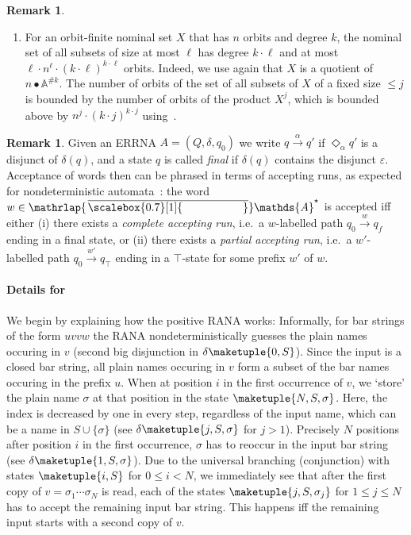 \documentclass[10pt,a4paper]{amsart}
\theoremstyle{definition}
\newtheorem{rem}[theo]{Remark}
\newcommand{\xra}[1]{\xrightarrow{#1}}
\newcommand{\xto}[1]{\xra{#1}}
\newcommand{\At}{\mathds{A}}
\newcommand{\barAs}{\barNames^{\star}}
\renewcommand{\epsilon}{\varepsilon}
\newcommand{\names}{\At}
\newcommand{\set}[1]{\{#1\}}
\newcommand{\mybar}[3]{%
  \mathrlap{\hspace{#2}\overline{\scalebox{#1}[1]{\phantom{\ensuremath{#3}}}}}\ensuremath{#3}
}
\newcommand{\barNames}{{\mybar{0.7}{1.25pt}{\names}}}
\renewcommand{\enquote}[1]{`#1'}
\begin{document}
\begin{rem}
\begin{enumerate}
  \item\label{R:Bell:5} For an orbit-finite nominal set $X$ that has $n$ orbits and degree $k$, the nominal set of all subsets of size at most $\ell$ has degree $k \cdot \ell$ and at most $\ell \cdot n^\ell \cdot (k\cdot \ell)^{k \cdot\ell}$ orbits.
    Indeed, we use again that $X$ is a quotient of $n \bullet
    \names^{\# k}$. The number of orbits of the set of all subsets of $X$ of a fixed size $\leqslant j$ is bounded by the number of orbits of the product $X^j$, which is bounded above by 
    $n^j \cdot (k\cdot j)^{k \cdot j}$ using~.
  \end{enumerate}
\end{rem}

\begin{rem}\label{rem:ernna}
Given an ERRNA $A=(Q,\delta,q_0)$ we write $q\xto{\alpha} q'$ if $\Diamond_\alpha q'$ is a disjunct of $\delta(q)$, and a state $q$ is called \emph{final} if $\delta(q)$ contains the disjunct $\epsilon$. Acceptance of words then can be phrased in terms of accepting runs, as expected for nondeterministic automata~\cite{skmw17,hms21}: the word $w\in \barAs$ is accepted iff either (i) there exists a \emph{complete accepting run}, i.e.~a $w$-labelled path $q_0\xto{w} q_f$ ending in a final state, or (ii) there exists a \emph{partial accepting run}, i.e.~a $w'$-labelled path $q_0\xto{w'} q_\top$ ending in a $\top$-state for some prefix $w'$ of $w$.
\end{rem}


\paragraph*{Details for }

We begin by explaining how the positive RANA works: Informally, for bar strings of the form $uvvw$ the RANA nondeterministically guesses the plain names occuring in $v$ (second big disjunction in $\delta\maketuple{0,S}$).
Since the input is a closed bar string, all plain names occuring in $v$ form a subset of the bar names occuring in
the prefix $u$. When at position $i$ in the first occurrence of $v$, we \enquote{store} the plain name $\sigma$
at that position in the state $\maketuple{N, S, \sigma}$. Here, the index is decreased by one in every step, regardless
of the input name, which can be a name in $S \cup \set{\sigma}$ (see $\delta\maketuple{j,S,\sigma}$ for $j > 1$).
Precisely $N$ positions after position $i$ in the first occurrence, $\sigma$ has to reoccur in the input bar string
(see $\delta\maketuple{1,S,\sigma}$). Due to the universal branching (conjunction) with states $\maketuple{i,S}$
for $0 \leqslant i < N$, we immediately see that after the first copy of $v = \sigma_1\cdots\sigma_N$ is read, each
of the states $\maketuple{j,S,\sigma_j}$ for $1 \leqslant j \leqslant N$ has to accept the remaining input bar string.
This happens iff the remaining input starts with a second copy of $v$.
\end{document}
